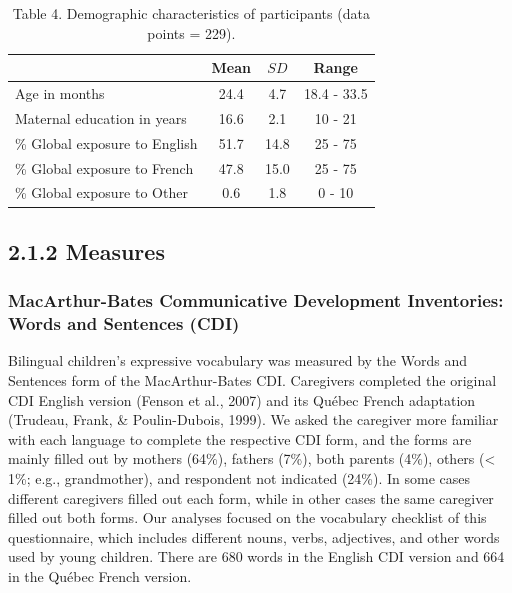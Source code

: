 \documentclass[
  english,
  ,man,floatsintext]{apa6}
\begin{document}
\begin{table}[h]

\begin{center}
\begin{threeparttable}

\caption{\label{tab:table4}Table 4. Demographic characteristics of participants (data points = 229).}

\begin{tabular}{lccc}
\toprule
 & Mean & $SD$ & Range\\
\midrule
Age in months & 24.4 & 4.7 & 18.4 - 33.5\\
Maternal education in years & 16.6 & 2.1 & 10 - 21\\
\% Global exposure to English & 51.7 & 14.8 & 25 - 75\\
\% Global exposure to French & 47.8 & 15.0 & 25 - 75\\
\% Global exposure to Other & 0.6 & 1.8 & 0 - 10\\
\bottomrule
\end{tabular}

\end{threeparttable}
\end{center}

\end{table}

\hypertarget{measures}{%
\subsection{2.1.2 Measures}\label{measures}}

\hypertarget{macarthur-bates-communicative-development-inventories-words-and-sentences-cdi}{%
\subsubsection{MacArthur-Bates Communicative Development Inventories: Words and Sentences (CDI)}\label{macarthur-bates-communicative-development-inventories-words-and-sentences-cdi}}

Bilingual children's expressive vocabulary was measured by the Words and Sentences form of the MacArthur-Bates CDI. Caregivers completed the original CDI English version (Fenson et al., 2007) and its Québec French adaptation (Trudeau, Frank, \& Poulin-Dubois, 1999). We asked the caregiver more familiar with each language to complete the respective CDI form, and the forms are mainly filled out by mothers (64\%), fathers (7\%), both parents (4\%), others (\textless{} 1\%; e.g., grandmother), and respondent not indicated (24\%). In some cases different caregivers filled out each form, while in other cases the same caregiver filled out both forms. Our analyses focused on the vocabulary checklist of this questionnaire, which includes different nouns, verbs, adjectives, and other words used by young children. There are 680 words in the English CDI version and 664 in the Québec French version.
\end{document}
